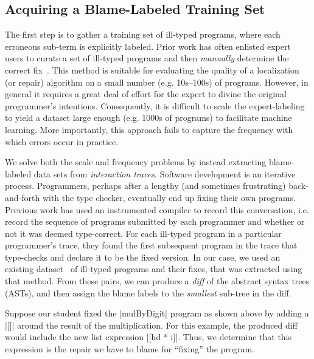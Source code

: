 \subsection{Acquiring a Blame-Labeled Training Set}
\label{sec:overview:data}

The first step is to gather a training set of ill-typed programs, where each
erroneous sub-term is explicitly labeled. Prior work has often enlisted expert
users to curate a set of ill-typed programs and then \emph{manually} determine
the correct fix~\citep[\eg][]{Lerner2007-dt, Loncaric2016-uk}. This method is
suitable for evaluating the quality of a localization (or repair) algorithm on a
small number (e.g. 10s--100s) of programs. However, in general it requires a
great deal of effort for the expert to divine the original programmer's
intentions. Consequently, it is difficult to scale the expert-labeling to yield
a dataset large enough (e.g. 1000s of programs) to facilitate machine learning.
More importantly, this approach fails to capture the frequency with which errors
occur in practice.

 We solve both the scale and frequency problems by
instead extracting blame-labeled data sets from \emph{interaction traces}.
Software development is an iterative process. Programmers, perhaps after a
lengthy (and sometimes frustrating) back-and-forth with the type checker,
eventually end up fixing their own programs. Previous work has used an
instrumented \ocaml compiler to record this conversation, i.e. record the
sequence of programs submitted by each programmer and whether or not it was
deemed type-correct. For each ill-typed program in a particular programmer's
trace, they found the first subsequent program in the trace that type-checks and
declare it to be the fixed version. In our case, we used an existing
dataset~\citep[][]{yunounderstand, Seidel:2017} of ill-typed programs and their
fixes, that was extracted using that method. From these pairs, we can produce a
\emph{diff} of the abstract syntax trees (ASTs), and then assign the blame
labels to the \emph{smallest} sub-tree in the diff.

 Suppose our student fixed the |mulByDigit| program as shown
above by adding a |[]| around the result of the multiplication. For this
example, the produced diff would include the new list expression |[hd * i]|.
Thus, we determine that this expression is the repair we have to blame for
``fixing'' the program.


